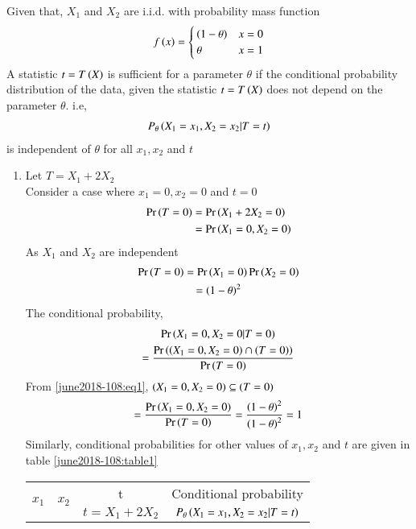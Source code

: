 Given that, $X_1$ and $X_2$ are i.i.d. with probability mass function
\begin{align}
    f\left(x\right) = 
    \begin{cases}
    \left(1-\theta\right) & x=0\\
    \theta & x=1
    \end{cases}
\end{align}
A statistic $t=T\left(X\right)$ is sufficient for a parameter $\theta$ if the conditional probability distribution of the data, given the statistic $t=T\left(X\right)$ does not depend on the parameter $\theta$. i.e,
\begin{align}
    P_\theta\left(X_1=x_1,X_2=x_2|T=t\right)
\end{align}
is independent of $\theta$ for all $x_1,x_2$ and $t$
\begin{enumerate}
    \item Let $T=X_1+2X_2$\\
    Consider a case where $x_1=0, x_2=0$ and $t=0$
    \begin{align}
    \Pr\left(T=0\right)&=\Pr\left(X_1+2X_2=0\right)\\
    \label{june2018-108:eq1}&=\Pr\left(X_1=0,X_2=0\right)
    \end{align}
    As $X_1$ and $X_2$ are independent
    \begin{multline}
        \Pr\left(T=0\right)=\Pr\left(X_1=0\right)\Pr\left(X_2=0\right)\\
        =\left(1-\theta\right)^2
    \end{multline}
   The conditional probability,
    \begin{multline}
        \Pr\left(X_1=0,X_2=0 | T=0\right)\\
        =\frac{\Pr\left(\left(X_1=0,X_2=0\right)\cap\left(T=0\right)\right)}{\Pr\left(T=0\right)}
    \end{multline}
    From \eqref{june2018-108:eq1}, $\left(X_1=0,X_2=0\right) \subseteq \left(T=0\right)$
    \begin{multline}
        =\frac{\Pr\left(X_1=0,X_2=0\right)}{\Pr\left(T=0\right)}=\frac{\left(1-\theta\right)^2}{\left(1-\theta\right)^2}=1
    \end{multline}
    Similarly, conditional probabilities for other values of $x_1,x_2$ and $t$ are given in table \ref{june2018-108:table1}
    \begin{table}[h!]
    \begin{tabular}[width=\columnwidth]{|c|c|c|c|}
         \hline
        \multirow{2}{*}{$x_1$} & \multirow{2}{*}{$x_2$} & t & Conditional probability\\
        & & $t=X_1+2X_2$ & $P_\theta\left(X_1=x_1,X_2=x_2|T=t\right)$\\

\end{tabular}
\end{table}
\end{enumerate}
